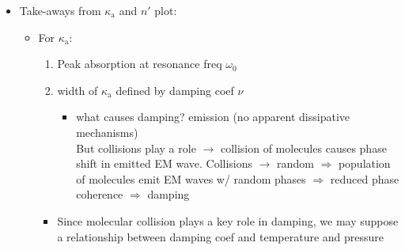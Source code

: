 \documentclass[11pt, oneside]{article}
\begin{document}
\begin{itemize}
	\item[--] Take-aways from $\kappa_\mathrm{a}$ and $n'$ plot:
	\begin{itemize}
		\item For $\kappa_\mathrm{a}$:
		\begin{enumerate}
			\item[1)] Peak absorption at resonance freq $\omega_0$
			\item[2)] width of $\kappa_\mathrm{a}$ defined by damping coef $\nu$
			\begin{itemize}
				\item[$\rightarrow$] what causes damping? emission (no apparent dissipative mechanisms)\\
				But collisions play a role $\rightarrow$ collision of molecules causes phase shift in emitted EM wave. Collisions $\rightarrow$ random $\Rightarrow$ population of molecules emit EM waves w/ random phases $\Rightarrow$ reduced phase coherence $\Rightarrow$ damping
			\end{itemize}
		\end{enumerate}
		\begin{itemize}
			\item[--] Since molecular collision plays a key role in damping, we may suppose a relationship between damping coef and temperature and pressure
			\begin{equation}
				\label{e:nuPT}

\end{equation}
\end{itemize}
\end{itemize}
\end{itemize}
\end{document}

